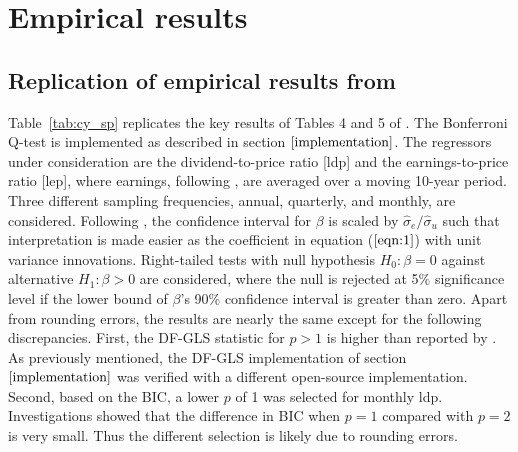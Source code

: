 \documentclass[11pt, a4paper]{article}
\begin{document}
\section{Empirical results}
\label{Empirical Results}
\subsection{Replication of empirical results from \citet{campbell2006efficient}}
Table~\vref{tab:cy_sp} replicates the key results of Tables 4 and 5 of \citet{campbell2006efficient}. The Bonferroni Q-test is implemented as described in section $\ref{implementation}$. The regressors under consideration are the dividend-to-price ratio [ldp] and the earnings-to-price ratio [lep], where earnings, following \citet{shiller2000irrational}, are averaged over a moving 10-year period. Three different sampling frequencies, annual, quarterly, and monthly, are considered. Following \citet{campbell2006efficient}, the confidence interval for $\beta$ is scaled by $\widehat{\sigma}_{e} / \widehat{\sigma}_{u}$ such that interpretation is made easier as the coefficient in equation ($\ref{eqn:1}$) with unit variance innovations. Right-tailed tests with null hypothesis $H_0: \beta=0$ against alternative $H_1: \beta>0$ are considered, where the null is rejected at 5\% significance level if the lower bound of $\beta$'s 90\% confidence interval is greater than zero. Apart from rounding errors, the results are nearly the same except for the following discrepancies. First, the DF-GLS statistic for $p>1$ is higher than reported by \citet{campbell2006efficient}.  As previously mentioned, the DF-GLS implementation of section $\ref{implementation}$ was verified with a different open-source implementation. Second, based on the BIC, a lower $p$ of 1 was selected for monthly ldp. Investigations showed that the difference in BIC when $p=1$ compared with $p=2$ is very small. Thus the different selection is likely due to rounding errors. 
\end{document}
